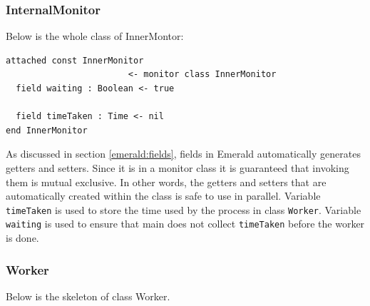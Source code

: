 \subsubsection{InternalMonitor}
Below is the whole class of InnerMontor:
\begin{lstlisting}[language=emerald]
attached const InnerMonitor 
                        <- monitor class InnerMonitor
  field waiting : Boolean <- true

  field timeTaken : Time <- nil
end InnerMonitor
\end{lstlisting}
As discussed in section \ref{emerald:fields}, fields in Emerald automatically generates getters and setters. Since it is in a monitor class it is guaranteed that invoking them is mutual exclusive. In other words, the getters and setters that are automatically created within the class is safe to use in parallel. Variable \verb|timeTaken| is used to store the time used by the process in class \verb|Worker|. Variable \verb|waiting| is used to ensure that main does not collect \verb|timeTaken| before the worker is done. 





\subsubsection{Worker}
Below is the skeleton of class Worker.

